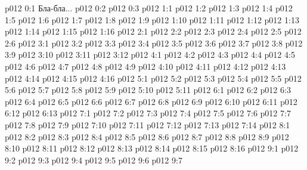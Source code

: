 \author{Совершенствователь Мудрости}
\vs p012 0:1  Бла-бла...
\vs p012 0:2 
\vs p012 0:3 
\vs p012 1:1 
\vs p012 1:2 
\vs p012 1:3 \pc 
\vs p012 1:4 
\vs p012 1:5 
\vs p012 1:6 
\vs p012 1:7 
\vs p012 1:8 
\vs p012 1:9 
\vs p012 1:10 \pc 
\vs p012 1:11 \pc 
\vs p012 1:12 
\vs p012 1:13 
\vs p012 1:14 
\vs p012 1:15 
\vs p012 1:16 
\vs p012 2:1 
\vs p012 2:2 
\vs p012 2:3 
\vs p012 2:4 \pc 
\vs p012 2:5 \pc 
\vs p012 2:6 
\vs p012 3:1 
\vs p012 3:2 
\vs p012 3:3 
\vs p012 3:4 
\vs p012 3:5 
\vs p012 3:6 \pc 
\vs p012 3:7 
\vs p012 3:8 
\vs p012 3:9 
\vs p012 3:10 
\vs p012 3:11 
\vs p012 3:12 \pc 
{}
\vs p012 4:1 
\vs p012 4:2 
\vs p012 4:3 
\vs p012 4:4 
\vs p012 4:5 
\vs p012 4:6 \pc 
\vs p012 4:7 \pc 
\vs p012 4:8 
\vs p012 4:9 
\vs p012 4:10 
\vs p012 4:11 
\vs p012 4:12 \pc 
\vs p012 4:13 
\vs p012 4:14 \pc 
\vs p012 4:15 
\vs p012 4:16 
\vs p012 5:1 
\vs p012 5:2 
\vs p012 5:3 \pc 
\vs p012 5:4 
\vs p012 5:5 \pc 
\vs p012 5:6 \pc 
\vs p012 5:7 
\vs p012 5:8 
\vs p012 5:9 
\vs p012 5:10 \pc 
\vs p012 5:11 
\vs p012 6:1 
\vs p012 6:2 
\vs p012 6:3 
\vs p012 6:4 
\vs p012 6:5 
\vs p012 6:6 \pc 
\vs p012 6:7 
\vs p012 6:8 \pc 
\vs p012 6:9 
\vs p012 6:10 
\vs p012 6:11 
\vs p012 6:12 
\vs p012 6:13 \pc 
{}
\vs p012 7:1 
\vs p012 7:2 \pc 
\vs p012 7:3 
\vs p012 7:4 
\vs p012 7:5 
\vs p012 7:6 
\vs p012 7:7 \pc 
\vs p012 7:8 
\vs p012 7:9 
\vs p012 7:10 
\vs p012 7:11 
\vs p012 7:12 \pc 
\vs p012 7:13 \pc 
\vs p012 7:14 
\vs p012 8:1 
\vs p012 8:2 \pc 
\vs p012 8:3 
\vs p012 8:4 \pc 
\vs p012 8:5 
\vs p012 8:6 \pc 
\vs p012 8:7 
\vs p012 8:8 
\vs p012 8:9 \pc 
\vs p012 8:10 
\vs p012 8:11 
\vs p012 8:12 
\vs p012 8:13 \pc 
\vs p012 8:14 \pc 
\vs p012 8:15 
\vs p012 8:16 
\vs p012 9:1 
\vs p012 9:2 \pc 
\vs p012 9:3 
\vs p012 9:4 
\vs p012 9:5 
\vs p012 9:6 \pc 
\vsetoff
\vs p012 9:7 
\quizlink
